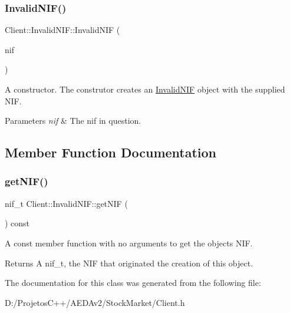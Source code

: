 \subsubsection{\texorpdfstring{Invalid\+N\+I\+F()}{InvalidNIF()}}
{\footnotesize\ttfamily Client\+::\+Invalid\+N\+I\+F\+::\+Invalid\+N\+IF (\begin{DoxyParamCaption}\item[{nif\+\_\+t}]{nif }\end{DoxyParamCaption})\hspace{0.3cm}{\ttfamily [inline]}}

A constructor. The construtor creates an \hyperlink{class_client_1_1_invalid_n_i_f}{Invalid\+N\+IF} object with the supplied N\+IF. 
\begin{DoxyParams}{Parameters}
{\em nif} & The nif in question. \\
\hline
\end{DoxyParams}


\subsection{Member Function Documentation}
\mbox{\label{class_client_1_1_invalid_n_i_f_a9ce8fd030fcd6ea099d40e3c53495684}} 
\subsubsection{\texorpdfstring{get\+N\+I\+F()}{getNIF()}}
{\footnotesize\ttfamily nif\+\_\+t Client\+::\+Invalid\+N\+I\+F\+::get\+N\+IF (\begin{DoxyParamCaption}{ }\end{DoxyParamCaption}) const\hspace{0.3cm}{\ttfamily [inline]}}

A const member function with no arguments to get the object\textquotesingle{}s N\+IF. \begin{DoxyReturn}{Returns}
A nif\+\_\+t, the N\+IF that originated the creation of this object. 
\end{DoxyReturn}


The documentation for this class was generated from the following file\+:\begin{DoxyCompactItemize}
\item 
D\+:/\+Projetos\+C++/\+A\+E\+D\+Av2/\+Stock\+Market/Client.\+h\end{DoxyCompactItemize}
